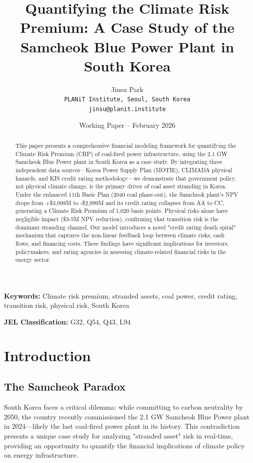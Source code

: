 \documentclass[11pt,a4paper]{article}
\title{Quantifying the Climate Risk Premium: A Case Study of the Samcheok Blue Power Plant in South Korea}
\author{Jinsu Park\\
\texttt{PLANiT Institute, Seoul, South Korea}\\
\texttt{jinsu@planit.institute}}
\date{Working Paper -- February 2026}
\begin{document}
\maketitle

\begin{abstract}
This paper presents a comprehensive financial modeling framework for quantifying the Climate Risk Premium (CRP) of coal-fired power infrastructure, using the 2.1 GW Samcheok Blue Power plant in South Korea as a case study. By integrating three independent data sources—Korea Power Supply Plan (MOTIE), CLIMADA physical hazards, and KIS credit rating methodology—we demonstrate that government policy, not physical climate change, is the primary driver of coal asset stranding in Korea. Under the enhanced 11th Basic Plan (2040 coal phase-out), the Samcheok plant's NPV drops from +\$3,098M to -\$2,999M and its credit rating collapses from AA to CC, generating a Climate Risk Premium of 1,020 basis points. Physical risks alone have negligible impact (\$3-5M NPV reduction), confirming that transition risk is the dominant stranding channel. Our model introduces a novel "credit rating death spiral" mechanism that captures the non-linear feedback loop between climate risks, cash flows, and financing costs. These findings have significant implications for investors, policymakers, and rating agencies in assessing climate-related financial risks in the energy sector.
\end{abstract}

\textbf{Keywords:} Climate risk premium, stranded assets, coal power, credit rating, transition risk, physical risk, South Korea

\textbf{JEL Classification:} G32, Q54, Q43, L94

\section{Introduction}

\subsection{The Samcheok Paradox}

South Korea faces a critical dilemma: while committing to carbon neutrality by 2050, the country recently commissioned the 2.1 GW Samcheok Blue Power plant in 2024—likely the last coal-fired power plant in its history. This contradiction presents a unique case study for analyzing "stranded asset" risk in real-time, providing an opportunity to quantify the financial implications of climate policy on energy infrastructure.
\end{document}
